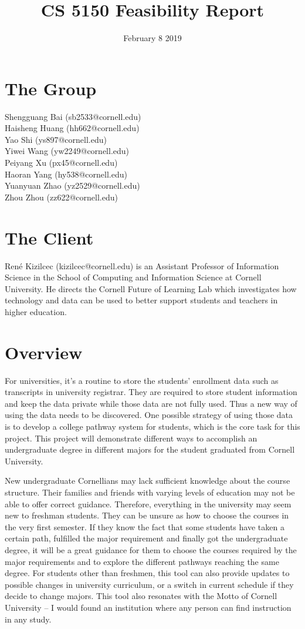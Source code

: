 \documentclass{article}
\title{CS 5150 Feasibility Report}
\author{}
\date{February 8 2019}
\begin{document}
\maketitle
\tableofcontents{}
\printindex{}
\pagebreak
\graphicspath{ {images/} }
\section{The Group}
Shengguang Bai (sb2533@cornell.edu)\\
Haisheng Huang (hh662@cornell.edu)\\
Yao Shi (ys897@cornell.edu)\\
Yiwei Wang (yw2249@cornell.edu)\\
Peiyang Xu (px45@cornell.edu)\\
Haoran Yang (hy538@cornell.edu)\\
Yuanyuan Zhao (yz2529@cornell.edu)\\
Zhou Zhou (zz622@cornell.edu)
\section{The Client}
René Kizilcec (kizilcec@cornell.edu) is an Assistant Professor of Information Science in the School of Computing and Information Science at Cornell University. He directs the Cornell Future of Learning Lab which investigates how technology and data can be used to better support students and teachers in higher education.
\section{Overview}
For universities, it’s a routine to store the students’ enrollment data such as transcripts in university registrar. They are required to store student information and keep the data private while those data are not fully used. Thus a new way of using the data needs to be discovered. One possible strategy of using those data is to develop a college pathway system for students, which is the core task for this project. This project will demonstrate different ways to accomplish an undergraduate degree in different majors for the student graduated from Cornell University. 

\vspace{0.4cm}New undergraduate Cornellians may lack sufficient knowledge about the course structure. Their families and friends with varying levels of education may not be able to offer correct guidance. Therefore, everything in the university may seem new to freshman students. They can be unsure as how to choose the courses in the very first semester. If they know the fact that some students have taken a certain path,  fulfilled the major requirement and finally got the undergraduate degree, it will be a great guidance for them to choose the courses required by the major requirements and to explore the different pathways reaching the same degree. For students other than freshmen, this tool can also provide updates to possible changes in university curriculum, or a switch in current schedule if they decide to change majors. This tool also resonates with the Motto of Cornell University -- I would found an institution where any person can find instruction in any study.
\end{document}
